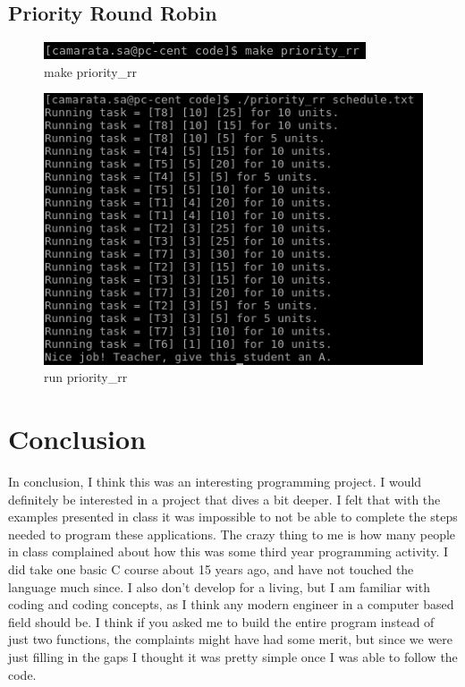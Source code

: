 \documentclass[10pt]{article}
\begin{document}
\subsection{Priority Round Robin}

\begin{figure}[H]
\centering
\includegraphics[scale=0.5]{./images/make_pri_rr.png}
\caption{make priority\_rr}
\label{fig:Code}
\end{figure}

\begin{figure}[H]
\centering
\includegraphics[scale=0.5]{./images/run_pri_rr.png}
\caption{run priority\_rr}
\label{fig:Code}
\end{figure}

\section{Conclusion}
In conclusion, I think this was an interesting programming project.  I would definitely be interested in a project that dives a bit deeper.  I felt that with the examples presented in class it was impossible to not be able to complete the steps needed to program these applications.  The crazy thing to me is how many people in class complained about how this was some third year programming activity.  I did take one basic C course about 15 years ago, and have not touched the language much since.  I also don't develop for a living, but I am familiar with coding and coding concepts, as I think any modern engineer in a computer based field should be.  I think if you asked me to build the entire program instead of just two functions, the complaints might have had some merit, but since we were just filling in the gaps I thought it was pretty simple once I was able to follow the code.
\end{document}
